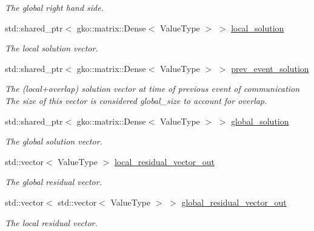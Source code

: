 \begin{DoxyCompactItemize}
\begin{DoxyCompactList}\small\item\em The global right hand side. \end{DoxyCompactList}\item 
\mbox{\label{classschwz_1_1SchwarzBase_a50b156f241360f12dd025b790203c58a}} 
std\+::shared\+\_\+ptr$<$ gko\+::matrix\+::\+Dense$<$ Value\+Type $>$ $>$ \hyperlink{classschwz_1_1SchwarzBase_a50b156f241360f12dd025b790203c58a}{local\+\_\+solution}
\begin{DoxyCompactList}\small\item\em The local solution vector. \end{DoxyCompactList}\item 
\mbox{\label{classschwz_1_1SchwarzBase_a5ae3e91ec47a6019973acf8a525c61a8}} 
std\+::shared\+\_\+ptr$<$ gko\+::matrix\+::\+Dense$<$ Value\+Type $>$ $>$ \hyperlink{classschwz_1_1SchwarzBase_a5ae3e91ec47a6019973acf8a525c61a8}{prev\+\_\+event\+\_\+solution}
\begin{DoxyCompactList}\small\item\em The (local+overlap) solution vector at time of previous event of communication The size of this vector is considered global\+\_\+size to account for overlap. \end{DoxyCompactList}\item 
\mbox{\label{classschwz_1_1SchwarzBase_a8b1916399b8d0272cfd95dac495f0c92}} 
std\+::shared\+\_\+ptr$<$ gko\+::matrix\+::\+Dense$<$ Value\+Type $>$ $>$ \hyperlink{classschwz_1_1SchwarzBase_a8b1916399b8d0272cfd95dac495f0c92}{global\+\_\+solution}
\begin{DoxyCompactList}\small\item\em The global solution vector. \end{DoxyCompactList}\item 
\mbox{\label{classschwz_1_1SchwarzBase_ad3f18c1a861f3502992545befaa5da6a}} 
std\+::vector$<$ Value\+Type $>$ \hyperlink{classschwz_1_1SchwarzBase_ad3f18c1a861f3502992545befaa5da6a}{local\+\_\+residual\+\_\+vector\+\_\+out}
\begin{DoxyCompactList}\small\item\em The global residual vector. \end{DoxyCompactList}\item 
\mbox{\label{classschwz_1_1SchwarzBase_abb47267d2343240fe80b17f1ea70b71e}} 
std\+::vector$<$ std\+::vector$<$ Value\+Type $>$ $>$ \hyperlink{classschwz_1_1SchwarzBase_abb47267d2343240fe80b17f1ea70b71e}{global\+\_\+residual\+\_\+vector\+\_\+out}
\begin{DoxyCompactList}\small\item\em The local residual vector. \end{DoxyCompactList}\end{DoxyCompactItemize}
